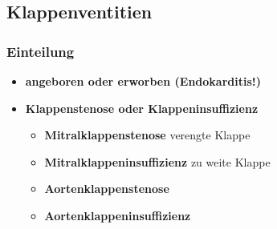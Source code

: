 \subsection{Klappenventitien}
	\subsubsection{Einteilung}
		\begin{itemize}
			\item \textbf{angeboren oder erworben (Endokarditis!)}
			\item \textbf{Klappenstenose oder Klappeninsuffizienz}
				\begin{itemize}
					\item \textbf{Mitralklappenstenose} verengte Klappe
					\item \textbf{Mitralklappeninsuffizienz} zu weite Klappe
					\item \textbf{Aortenklappenstenose}
					\item \textbf{Aortenklappeninsuffizienz} 
				\end{itemize}
		\end{itemize}
